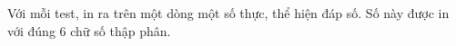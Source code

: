 Với mỗi test, in ra trên một dòng một số thực, thể hiện đáp số. Số này được in với đúng 6 chữ số thập phân.